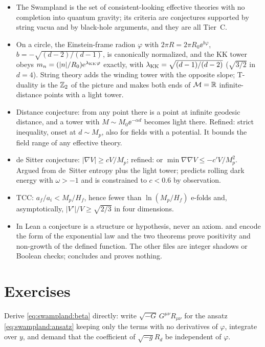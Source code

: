\begin{summarybox}
\begin{itemize}[leftmargin=*,itemsep=1pt]
\item The Swampland is the set of consistent-looking effective theories with no completion into
 quantum gravity; its criteria are conjectures supported by string vacua and by black-hole
 arguments, and they are all Tier~C.
\item On a circle, the Einstein-frame radion $\varphi$ with $2\pi R=2\pi R_0\ee^{b\varphi}$,
 $b=-\sqrt{(d-2)/(d-1)}$, is canonically normalized, and the KK tower obeys
 $m_n=(|n|/R_0)\mathrm{e}^{\lambda_{\rm KK}\varphi}$ exactly, with $\lambda_{\rm KK}=\sqrt{(d-1)/(d-2)}$
 ($\sqrt{3/2}$ in $d=4$). String theory adds the winding tower with the opposite slope;
 T-duality is the $\mathbb{Z}_2$ of the picture and makes both ends of $\mathcal M=\mathbb{R}$ infinite-distance
 points with a light tower.
\item Distance conjecture: from any point there is a point at infinite geodesic distance, and a
 tower with $M\sim M_0\ee^{-\alpha d}$ becomes light there. Refined: strict inequality, onset at
 $d\sim M_p$, also for fields with a potential. It bounds the field range of any effective theory.
\item de Sitter conjecture: $|\nabla V|\ge cV/M_p$; refined: or $\min\nabla\nabla V\le-c'V/M_p^2$.
 Argued from de~Sitter entropy plus the light tower; predicts rolling dark energy with $\omega>-1$
 and is constrained to $c<0.6$ by observation.
\item TCC: $a_f/a_i<M_p/H_f$, hence fewer than $\ln(M_p/H_f)$ e-folds and, asymptotically,
 $|V'|/V\ge\sqrt{2/3}$ in four dimensions.
\item In Lean a conjecture is a structure or hypothesis, never an axiom.  and
  encode the form of the exponential law and the two theorems prove
 positivity and non-growth of the defined function. The other files are integer shadows or
 Boolean checks;  concludes  and proves nothing.
\end{itemize}
\end{summarybox}

\section*{Exercises}

\begin{exercise}[$\star$]
Derive \eqref{eq:swampland:beta} directly: write $\sqrt{-G}\,G^{\mu\nu}R_{\mu\nu}$ for the ansatz
\eqref{eq:swampland:ansatz} keeping only the terms with no derivatives of $\varphi$, integrate over
$y$, and demand that the coefficient of $\sqrt{-g}R_d$ be independent of $\varphi$.
\end{exercise}

